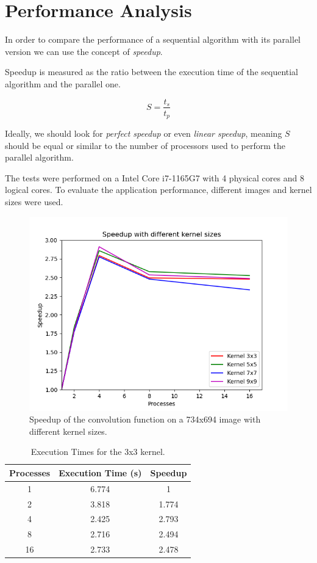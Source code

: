 \documentclass[10pt,twocolumn,letterpaper]{article}
\begin{document}
\section{Performance Analysis}
In order to compare the performance of a sequential algorithm with its parallel version we can use the concept of \textit{speedup}.

Speedup is measured as the ratio between the execution time of the sequential algorithm and the parallel one.

\[S = \frac{t_s}{t_p}\]

Ideally, we should look for \textit{perfect speedup} or even \textit{linear speedup}, meaning $S$ should be equal or similar to the number of processors used to perform the parallel algorithm.

The tests were performed on a Intel Core i7-1165G7 with 4 physical cores and 8 logical cores. To evaluate the application performance, different images and kernel sizes were used.

\begin{figure}[H]
	\includegraphics[width=\linewidth]{images/speedup_by_kernel_sizes.png}
	\caption{Speedup of the convolution function on a 734x694 image with different kernel sizes.}
	\label{fig:speedup_kernel}
\end{figure}

\begin{table}[H]
	\begin{center}
		\begin{tabular}{|c|c|c|}
			\hline
			Processes & Execution Time (s) & Speedup \\
			\hline
			1 & 6.774 & 1 \\
			2 & 3.818 & 1.774 \\
			4 & 2.425 & 2.793 \\
			8 & 2.716 & 2.494 \\
			16 & 2.733 & 2.478 \\
			\hline
		\end{tabular}
	\end{center}
	\caption{Execution Times for the 3x3 kernel.}
	\label{tab:speedup_k_1}
\end{table}
\end{document}
